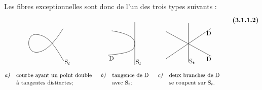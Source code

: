 \documentclass[11pt,leqno]{article}
\begin{document}
Les fibres exceptionnelles sont donc de l’un des trois types suivants :
\[
\begin{tikzcd}[
  ampersand replacement=\&,
  column sep=1.4em,
  row sep=1em,
  baseline=(current bounding box.north),
  cells={nodes={inner sep=0pt}}
]
{
\begin{tikzpicture}[x=0.8cm,y=0.8cm,baseline=0pt]
\draw[line width=0.5pt]
 (1.05,1.05)
 .. controls (0.45,0.05) and (-0.20,-0.60) .. (-0.80,-0.60)
 .. controls (-1.50,-0.60) and (-1.50,0.65) .. (-0.85,0.65)
 .. controls (0.05,0.62) and (0.50,-0.20) .. (1.10,-1.20);
\node[anchor=west] at (1.15,-1.30) {\(\mathrm S_t\)};
\end{tikzpicture}
}
\&
{
\begin{tikzpicture}[x=0.8cm,y=0.8cm,baseline=0pt]
\draw[line width=0.5pt] (0.60,-1.50)--(0.60,1.50);
\draw[line width=0.5pt]
 (-1.00,0.90)
 .. controls (0.15,0.72) and (0.60,0.40) .. (0.60,0)
 .. controls (0.60,-0.50) and (0.15,-0.66) .. (-1.25,-0.80);
\node[anchor=north west] at (-1.20,-0.85) {\(\mathrm D\)};
\node[anchor=west] at (0.65,-1.30) {\(\mathrm S_t\)};
\end{tikzpicture}
}
\&
{
\begin{tikzpicture}[x=0.8cm,y=0.8cm,baseline=0pt]
\draw[line width=0.5pt] (0,-1.30)--(0,1.45);
\draw[line width=0.5pt] (-1.55,-1.05)--(1.55,1.05);
\draw[line width=0.5pt] (-1.55,0.85)--(1.60,-0.88);
\node[anchor=north east] at (1.60,0.90) {\(\mathrm D\)};
\node[anchor=north east] at (1.60,-0.90) {\(\mathrm D\)};
\node[anchor=west] at (0.05,-1.25) {\(\mathrm S_t\)};
\end{tikzpicture}
}
\\
{
\begin{array}{@{}ll@{}}
\text{\small\textit{a)}} & \text{\small courbe ayant un point double}\\
 & \text{\small à tangentes distinctes;}
\end{array}
}
\&
{
\begin{array}{@{}ll@{}}
\text{\small\textit{b)}} & \text{\small tangence de \(\mathrm D\)}\\
 & \text{\small avec \(\mathrm S_t\);}
\end{array}
}
\&
{
\begin{array}{@{}ll@{}}
\text{\small\textit{c)}} & \text{\small deux branches de \(\mathrm D\)}\\
 & \text{\small se coupent sur \(\mathrm S_t\).}
\end{array}
}
\end{tikzcd}
\tag*{\textbf{(3.1.1.2)}}
\]
\end{document}
